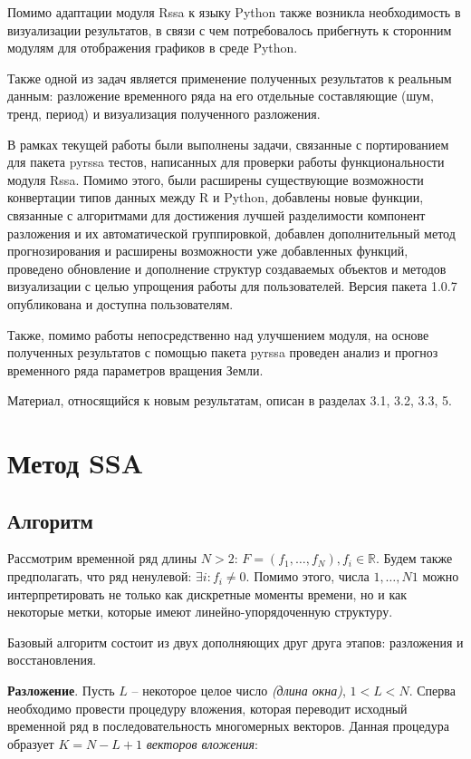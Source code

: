 \documentclass[specialist,
			   substylefile = spbu_report.rtx,
			   subf,href,colorlinks=true, 12pt]{disser}
\begin{document}
Помимо адаптации модуля Rssa к языку Python также возникла необходимость в визуализации результатов, в связи с чем потребовалось прибегнуть к сторонним модулям для отображения графиков в среде Python.

Также одной из задач является применение полученных результатов к реальным данным: разложение временного ряда на его отдельные составляющие (шум, тренд, период) и визуализация полученного разложения.

В рамках текущей работы были выполнены задачи, связанные с портированием для пакета pyrssa тестов, написанных для проверки работы функциональности модуля Rssa. Помимо этого, были расширены существующие возможности конвертации типов данных между R и Python, добавлены новые функции, связанные с алгоритмами для достижения лучшей разделимости компонент разложения и их автоматической группировкой, добавлен дополнительный метод прогнозирования и расширены возможности уже добавленных функций, проведено обновление и дополнение структур создаваемых объектов и методов визуализации с целью упрощения работы для пользователей. Версия пакета 1.0.7 опубликована и доступна пользователям.

Также, помимо работы непосредственно над улучшением модуля, на основе полученных результатов с помощью пакета pyrssa проведен анализ и прогноз временного ряда параметров вращения Земли.

Материал, относящийся к новым результатам, описан в разделах 3.1, 3.2, 3.3, 5.

\chapter{Метод SSA}

\section{Алгоритм}

Рассмотрим временной ряд длины $N > 2$: $F = (f_1, \dots, f_{N}), f_i \in \mathbb{R}$. Будем также предполагать, что ряд ненулевой: $\exists  i: f_i \neq 0$. Помимо этого, числа $1, \dots, N1$ можно интерпретировать не только как дискретные моменты времени, но и как некоторые метки, которые имеют линейно-упорядоченную структуру.

Базовый алгоритм состоит из двух дополняющих друг друга этапов: разложения и восстановления.



\textbf{Разложение}. Пусть $L$ – некоторое целое число \textit{(длина окна)}, $1 < L < N$. Сперва необходимо провести процедуру вложения, которая переводит исходный временной ряд в последовательность многомерных векторов. Данная процедура образует $K = N - L + 1$ \textit{векторов вложения}:
\end{document}
